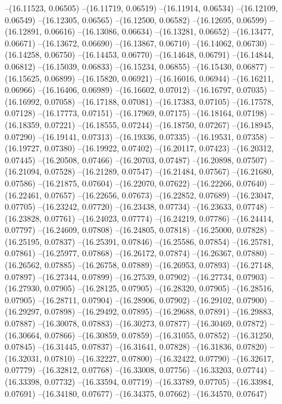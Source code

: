 --(16.11523, 0.06505)
--(16.11719, 0.06519)
--(16.11914, 0.06534)
--(16.12109, 0.06549)
--(16.12305, 0.06565)
--(16.12500, 0.06582)
--(16.12695, 0.06599)
--(16.12891, 0.06616)
--(16.13086, 0.06634)
--(16.13281, 0.06652)
--(16.13477, 0.06671)
--(16.13672, 0.06690)
--(16.13867, 0.06710)
--(16.14062, 0.06730)
--(16.14258, 0.06750)
--(16.14453, 0.06770)
--(16.14648, 0.06791)
--(16.14844, 0.06812)
--(16.15039, 0.06833)
--(16.15234, 0.06855)
--(16.15430, 0.06877)
--(16.15625, 0.06899)
--(16.15820, 0.06921)
--(16.16016, 0.06944)
--(16.16211, 0.06966)
--(16.16406, 0.06989)
--(16.16602, 0.07012)
--(16.16797, 0.07035)
--(16.16992, 0.07058)
--(16.17188, 0.07081)
--(16.17383, 0.07105)
--(16.17578, 0.07128)
--(16.17773, 0.07151)
--(16.17969, 0.07175)
--(16.18164, 0.07198)
--(16.18359, 0.07221)
--(16.18555, 0.07244)
--(16.18750, 0.07267)
--(16.18945, 0.07290)
--(16.19141, 0.07313)
--(16.19336, 0.07335)
--(16.19531, 0.07358)
--(16.19727, 0.07380)
--(16.19922, 0.07402)
--(16.20117, 0.07423)
--(16.20312, 0.07445)
--(16.20508, 0.07466)
--(16.20703, 0.07487)
--(16.20898, 0.07507)
--(16.21094, 0.07528)
--(16.21289, 0.07547)
--(16.21484, 0.07567)
--(16.21680, 0.07586)
--(16.21875, 0.07604)
--(16.22070, 0.07622)
--(16.22266, 0.07640)
--(16.22461, 0.07657)
--(16.22656, 0.07673)
--(16.22852, 0.07689)
--(16.23047, 0.07705)
--(16.23242, 0.07720)
--(16.23438, 0.07734)
--(16.23633, 0.07748)
--(16.23828, 0.07761)
--(16.24023, 0.07774)
--(16.24219, 0.07786)
--(16.24414, 0.07797)
--(16.24609, 0.07808)
--(16.24805, 0.07818)
--(16.25000, 0.07828)
--(16.25195, 0.07837)
--(16.25391, 0.07846)
--(16.25586, 0.07854)
--(16.25781, 0.07861)
--(16.25977, 0.07868)
--(16.26172, 0.07874)
--(16.26367, 0.07880)
--(16.26562, 0.07885)
--(16.26758, 0.07889)
--(16.26953, 0.07893)
--(16.27148, 0.07897)
--(16.27344, 0.07899)
--(16.27539, 0.07902)
--(16.27734, 0.07903)
--(16.27930, 0.07905)
--(16.28125, 0.07905)
--(16.28320, 0.07905)
--(16.28516, 0.07905)
--(16.28711, 0.07904)
--(16.28906, 0.07902)
--(16.29102, 0.07900)
--(16.29297, 0.07898)
--(16.29492, 0.07895)
--(16.29688, 0.07891)
--(16.29883, 0.07887)
--(16.30078, 0.07883)
--(16.30273, 0.07877)
--(16.30469, 0.07872)
--(16.30664, 0.07866)
--(16.30859, 0.07859)
--(16.31055, 0.07852)
--(16.31250, 0.07845)
--(16.31445, 0.07837)
--(16.31641, 0.07828)
--(16.31836, 0.07820)
--(16.32031, 0.07810)
--(16.32227, 0.07800)
--(16.32422, 0.07790)
--(16.32617, 0.07779)
--(16.32812, 0.07768)
--(16.33008, 0.07756)
--(16.33203, 0.07744)
--(16.33398, 0.07732)
--(16.33594, 0.07719)
--(16.33789, 0.07705)
--(16.33984, 0.07691)
--(16.34180, 0.07677)
--(16.34375, 0.07662)
--(16.34570, 0.07647)
